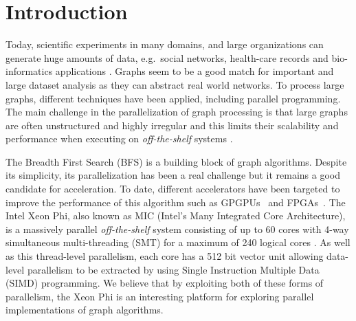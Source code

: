 \documentclass{sig-alternate-05-2015}
\begin{document}










\section{Introduction}

Today, scientific experiments in many domains, and large organizations
can generate huge amounts of data, e.g.\ social networks, health-care
records and bio-informatics applications \cite{graphCT}. Graphs seem to
be a good match for important and large dataset analysis as they can
abstract real world networks. To process large graphs, different
techniques have been applied, including parallel programming. The main
challenge in the parallelization of graph processing is that large
graphs are often unstructured and highly irregular and this limits
their scalability and performance when executing on
\textit{off-the-shelf} systems \cite{challenges}.

The Breadth First Search (BFS) is a building block of graph
algorithms. Despite its simplicity, its parallelization has been a
real challenge but it remains a good candidate for acceleration. To
date, different accelerators have been targeted to improve the
performance of this algorithm such as GPGPUs~\cite{Olukotun2011} and
FPGAs~\cite{Yaman15}. The Intel Xeon Phi, also known as MIC (Intel's
Many Integrated Core Architecture), is a massively parallel
\textit{off-the-shelf} system consisting of up to 60 cores with 4-way
simultaneous multi-threading (SMT) for a maximum of 240 logical cores
\cite{xeonphiBook2}. As well as this thread-level parallelism, each
core has a 512 bit vector unit allowing data-level parallelism to be
extracted by using Single Instruction Multiple Data (SIMD)
programming. We believe that by exploiting both of these forms of
parallelism, the Xeon Phi is an interesting platform for exploring
parallel implementations of graph algorithms.
\end{document}

